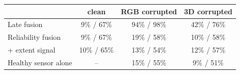 \begin{tabular}{lccc}
\toprule
 & clean & RGB corrupted & 3D corrupted \\
\midrule
Late fusion & 9\% / 67\% & 94\% / 98\% & 42\% / 76\% \\
Reliability fusion & 9\% / 67\% & 19\% / 58\% & 10\% / 58\% \\
\quad + extent signal & 10\% / 65\% & 13\% / 54\% & 12\% / 57\% \\
Healthy sensor alone & -- & 15\% / 55\% & 9\% / 51\% \\
\bottomrule
\end{tabular}

